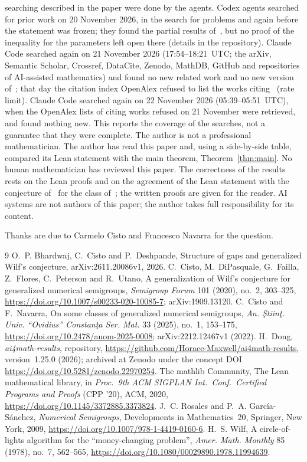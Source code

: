 \documentclass[11pt]{article}
\theoremstyle{definition}
\theoremstyle{remark}
\newcommand{\repoversion}{1.25.0}
\begin{document}
searching described in the paper were done by the agents. Codex agents searched
for prior work on 20 November 2026, in the search for problems and again before
the statement was frozen; they found the partial results of~\cite{bcd}, but no
proof of the inequality for the parameters left open there (details in the
repository). Claude Code searched again on 21 November 2026 (17:54--18:21~UTC; the arXiv, Semantic Scholar, Crossref, DataCite, Zenodo, MathDB, GitHub and repositories of AI-assisted mathematics) and found no new related work and no new version of~\cite{bcd}; that day the citation index OpenAlex refused to list the works citing~\cite{cn} (rate limit). Claude Code searched again on 22 November 2026 (05:39--05:51~UTC), when the OpenAlex lists of citing works refused on 21 November were retrieved, and found nothing new. This reports the coverage of the searches, not
a guarantee that they were complete. The author is not a professional
mathematician. The author has read this paper and, using a side-by-side table, compared its Lean statement with the main theorem, Theorem~\ref{thm:main}. No human mathematician has reviewed this paper. The
correctness of the results rests on the Lean proofs and on the agreement of the
Lean statement with the conjecture of~\cite{cdffpu} for the class of~\cite{cn};
the written proofs are given for the reader. AI systems are not authors of this
paper; the author takes full responsibility for its content.

\medskip
\noindent Thanks are due to Carmelo Cisto and Francesco Navarra for the
question.

{\small
\begin{thebibliography}{9}
\setlength{\itemsep}{1pt}
 O.~P. Bhardwaj, C.~Cisto and P.~Deshpande, Structure of gaps and
generalized Wilf's conjecture, arXiv:2611.20086v1, 2026.
 C.~Cisto, M.~DiPasquale, G.~Failla, Z.~Flores, C.~Peterson and
R.~Utano, A generalization of Wilf's conjecture for generalized numerical
semigroups, \emph{Semigroup Forum} 101 (2020), no.~2, 303--325,
\url{https://doi.org/10.1007/s00233-020-10085-7}; arXiv:1909.13120.
 C.~Cisto and F.~Navarra, On some classes of generalized numerical
semigroups, \emph{An. Ştiinţ. Univ. ``Ovidius'' Constanţa Ser. Mat.} 33
(2025), no.~1, 153--175, \url{https://doi.org/10.2478/auom-2025-0008};
arXiv:2212.12467v1 (2022).
 H.~Dong, \emph{ai4math-results}, repository,
\url{https://github.com/Horace-Maxwell/ai4math-results}, version~\repoversion{}
(2026); archived at Zenodo under the concept DOI
\url{https://doi.org/10.5281/zenodo.22970254}.
The mathlib Community, The Lean mathematical library, in \emph{Proc.\ 9th ACM
SIGPLAN Int.\ Conf.\ Certified Programs and Proofs} (CPP '20), ACM, 2020,
\url{https://doi.org/10.1145/3372885.3373824}.
 J.~C. Rosales and P.~A. García-Sánchez, \emph{Numerical
Semigroups}, Developments in Mathematics~20, Springer, New York, 2009,
\url{https://doi.org/10.1007/978-1-4419-0160-6}.
 H.~S. Wilf, A circle-of-lights algorithm for the
``money-changing problem'', \emph{Amer. Math. Monthly} 85 (1978), no.~7,
562--565, \url{https://doi.org/10.1080/00029890.1978.11994639}.
\end{thebibliography}}
\end{document}
